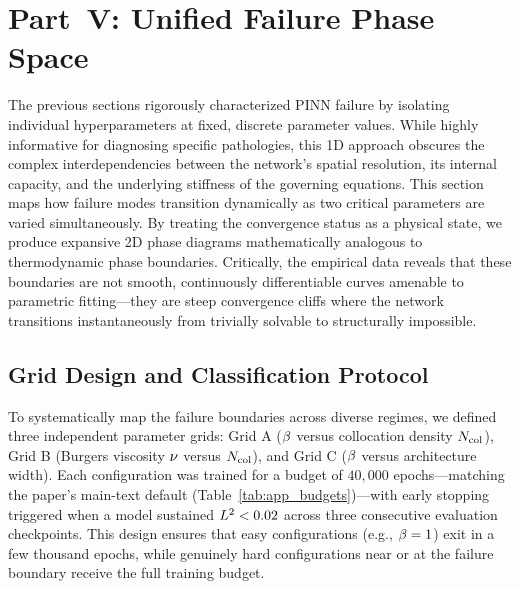 \section{Part~V: Unified Failure Phase Space}\label{sec:part5}

The previous sections rigorously characterized PINN failure by isolating individual hyperparameters at fixed, discrete parameter values. While highly informative for diagnosing specific pathologies, this 1D approach obscures the complex interdependencies between the network's spatial resolution, its internal capacity, and the underlying stiffness of the governing equations. This section maps how failure modes transition dynamically as two critical parameters are varied simultaneously. By treating the convergence status as a physical state, we produce expansive 2D phase diagrams mathematically analogous to thermodynamic phase boundaries. Critically, the empirical data reveals that these boundaries are not smooth, continuously differentiable curves amenable to parametric fitting—they are steep convergence cliffs where the network transitions instantaneously from trivially solvable to structurally impossible.

\subsection{Grid Design and Classification Protocol}\label{sec:exp25}\label{sec:phaseintro}

To systematically map the failure boundaries across diverse regimes, we defined three independent parameter grids: Grid A ($\beta$ versus collocation density $N_{\mathrm{col}}$), Grid B (Burgers viscosity $\nu$ versus $N_{\mathrm{col}}$), and Grid C ($\beta$ versus architecture width). Each configuration was trained for a budget of $40{,}000$ epochs—matching the paper's main-text default (Table~\ref{tab:app_budgets})—with early stopping triggered when a model sustained $L^2 < 0.02$ across three consecutive evaluation checkpoints. This design ensures that easy configurations (e.g., $\beta=1$) exit in a few thousand epochs, while genuinely hard configurations near or at the failure boundary receive the full training budget.

